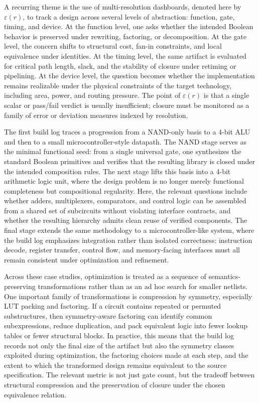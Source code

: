 \documentclass[11pt]{article}
\begin{document}
A recurring theme is the use of multi-resolution dashboards, denoted here by \(\varepsilon(r)\), to track a design across several levels of abstraction: function, gate, timing, and device. At the function level, one asks whether the intended Boolean behavior is preserved under rewriting, factoring, or decomposition. At the gate level, the concern shifts to structural cost, fan-in constraints, and local equivalence under identities. At the timing level, the same artifact is evaluated for critical path length, slack, and the stability of closure under retiming or pipelining. At the device level, the question becomes whether the implementation remains realizable under the physical constraints of the target technology, including area, power, and routing pressure. The point of \(\varepsilon(r)\) is that a single scalar or pass/fail verdict is usually insufficient; closure must be monitored as a family of error or deviation measures indexed by resolution.

The first build log traces a progression from a NAND-only basis to a 4-bit ALU and then to a small microcontroller-style datapath. The NAND stage serves as the minimal functional seed: from a single universal gate, one synthesizes the standard Boolean primitives and verifies that the resulting library is closed under the intended composition rules. The next stage lifts this basis into a 4-bit arithmetic logic unit, where the design problem is no longer merely functional completeness but compositional regularity. Here, the relevant questions include whether adders, multiplexers, comparators, and control logic can be assembled from a shared set of subcircuits without violating interface contracts, and whether the resulting hierarchy admits clean reuse of verified components. The final stage extends the same methodology to a microcontroller-like system, where the build log emphasizes integration rather than isolated correctness: instruction decode, register transfer, control flow, and memory-facing interfaces must all remain consistent under optimization and refinement.

Across these case studies, optimization is treated as a sequence of semantics-preserving transformations rather than as an ad hoc search for smaller netlists. One important family of transformations is compression by symmetry, especially LUT packing and factoring. If a circuit contains repeated or permuted substructures, then symmetry-aware factoring can identify common subexpressions, reduce duplication, and pack equivalent logic into fewer lookup tables or fewer structural blocks. In practice, this means that the build log records not only the final size of the artifact but also the symmetry classes exploited during optimization, the factoring choices made at each step, and the extent to which the transformed design remains equivalent to the source specification. The relevant metric is not just gate count, but the tradeoff between structural compression and the preservation of closure under the chosen equivalence relation.
\end{document}
